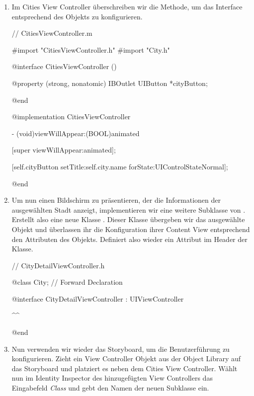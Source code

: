 \documentclass[parskip=half, final]{scrreprt}
\begin{document}
\begin{lecture}
\begin{enumerate}
\item Im Cities View Controller überschreiben wir die  Methode, um das Interface entsprechend des  Objekts zu konfigurieren.

\begin{objclst}
// CitiesViewController.m

#import "CitiesViewController.h"
#import "City.h"

@interface CitiesViewController ()

@property (strong, nonatomic) IBOutlet UIButton *cityButton;

@end

@implementation CitiesViewController

- (void)viewWillAppear:(BOOL)animated
{
    [super viewWillAppear:animated];
    
    [self.cityButton setTitle:self.city.name forState:UIControlStateNormal];
}

@end
\end{objclst}

\item Um nun einen Bildschirm zu präsentieren, der die Informationen der ausgewählten Stadt anzeigt, implementieren wir eine weitere Subklasse von . Erstellt also eine neue Klasse . Dieser Klasse übergeben wir das ausgewählte  Objekt und überlassen ihr die Konfiguration ihrer Content View entsprechend den Attributen des Objekts. Definiert also wieder ein Attribut  im Header der  Klasse.

\begin{objclst}
// CityDetailViewController.h

@class City; // Forward Declaration

@interface CityDetailViewController : UIViewController

^^

@end
\end{objclst}

\item Nun verwenden wir wieder das Storyboard, um die Benutzerführung zu konfigurieren. Zieht ein View Controller Objekt aus der Object Library auf das Storyboard und platziert es neben dem Cities View Controller. Wählt nun im Identity Inspector des hinzugefügten View Controllers das Eingabefeld \emph{Class} und gebt den Namen der neuen  Subklasse  ein.


\end{enumerate}
\end{lecture}
\end{document}
